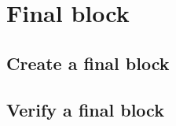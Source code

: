 \documentclass[../hydrozoa.tex]{subfiles}
\begin{document}
\section{Final block}%
\label{h:l2-final-block}%


\subsection{Create a final block}%
\label{h:l2-final-block-create}%


\subsection{Verify a final block}%
\label{h:l2-final-block-verify}%

\end{document}
